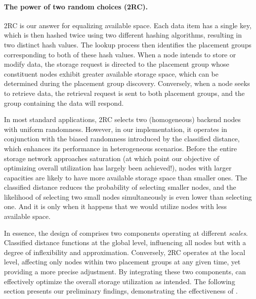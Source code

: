 \paragraph{The power of two random choices (2RC)\@.}
2RC is our answer for equalizing available space.
Each data item has a single key, which is then hashed twice using two different hashing algorithms, resulting in two distinct hash values. The lookup process then identifies the placement groups corresponding to both of these hash values.
When a node intends to store or modify data, the storage request is directed to the placement group whose constituent nodes exhibit greater available storage space, which can be determined during the placement group discovery.
Conversely, when a node seeks to retrieve data, the retrieval request is sent to both placement groups, and the group containing the data will respond.

In most standard applications, 2RC selects two (homogeneous) backend nodes with uniform randomness.
However, in our implementation, it operates in conjunction with the biased randomness introduced by the classified distance, which enhances its performance in heterogeneous scenarios.
Before the entire storage network approaches saturation (at which point our objective of optimizing overall utilization has largely been achieved!), nodes with larger capacities are likely to have more available storage space than smaller ones.
The classified distance reduces the probability of selecting smaller nodes, and the likelihood of selecting two small nodes simultaneously is even lower than selecting one.
And it is only when it happens that we would utilize nodes with less available space.

In essence, the design of \dht comprises two components operating at different \emph{scales}.
Classified distance functions at the global level, influencing all nodes but with a degree of inflexibility and approximation.
Conversely, 2RC operates at the local level, affecting only nodes within two placement groups at any given time, yet providing a more precise adjustment.
By integrating these two components, \dht can effectively optimize the overall storage utilization as intended.
The following section presents our preliminary findings, demonstrating the effectiveness of \dht.


